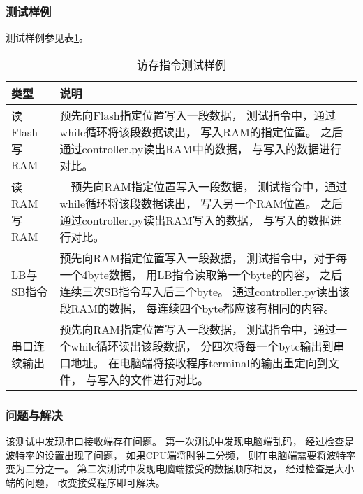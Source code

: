         \subsubsection{测试样例}
            测试样例参见表\ref{memory}。
            \begin{table}[!hbp]
            \centering
            \caption{访存指令测试样例}
            \label{memory}
            \begin{tabularx}{\textwidth}{|l|X|}
            \hline
            类型 & 说明 \\
            \hline
            读Flash写RAM & 预先向Flash指定位置写入一段数据，%
                            测试指令中，通过while循环将该段数据读出，%
                            写入RAM的指定位置。%
                            之后通过controller.py读出RAM中的数据，%
                            与写入的数据进行对比。 \\
            \hline
            读RAM写RAM &　预先向RAM指定位置写入一段数据，%
                        测试指令中，通过while循环将该段数据读出，%
                        写入另一个RAM位置。%
                        之后通过controller.py读出RAM写入的数据，%
                        与写入的数据进行对比。 \\
            \hline
            LB与SB指令 & 预先向RAM指定位置写入一段数据，%
                        测试指令中，对于每一个4byte数据，%
                        用LB指令读取第一个byte的内容，%
                        之后连续三次SB指令写入后三个byte。%
                        通过controller.py读出该段RAM的数据，%
                        每连续四个byte都应该有相同的内容。 \\
            \hline
            串口连续输出 & 预先向RAM指定位置写入一段数据，%
                         测试指令中，通过一个while循环读出该段数据，%
                         分四次将每一个byte输出到串口地址。%
                         在电脑端将接收程序terminal的输出重定向到文件，%
                         与写入的文件进行对比。    \\
            \hline
            \end{tabularx}
            \end{table}

        \subsubsection{问题与解决}
            该测试中发现串口接收端存在问题。%
            第一次测试中发现电脑端乱码，%
            经过检查是波特率的设置出现了问题，%
            如果CPU端将时钟二分频，%
            则在电脑端需要将波特率变为二分之一。%
            第二次测试中发现电脑端接受的数据顺序相反，%
            经过检查是大小端的问题，%
            改变接受程序即可解决。

